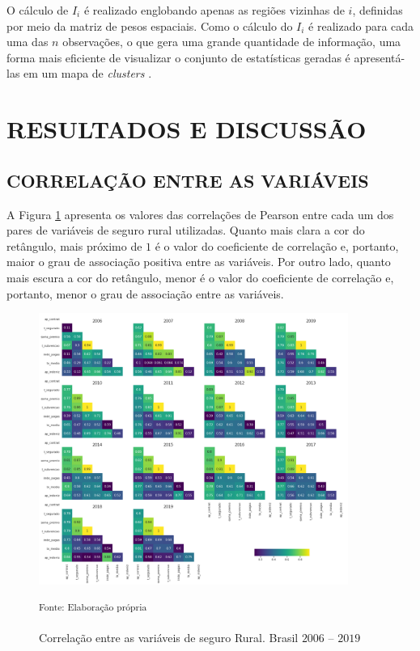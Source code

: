 O cálculo de $I_i$ é realizado englobando apenas as regiões vizinhas de $i$, definidas por meio da matriz de pesos espaciais. Como o cálculo do $I_i$ é realizado para cada uma das $n$ observações, o que gera uma grande quantidade de informação, uma forma mais eficiente de visualizar o conjunto de estatísticas geradas é apresentá-las em um mapa de \textit{clusters} \cite{almeida12_2}. 

\section{RESULTADOS E DISCUSSÃO}

\subsection{CORRELAÇÃO ENTRE AS VARIÁVEIS} 

A Figura \ref{corr_anos} apresenta os valores das correlações de Pearson entre cada um dos pares de variáveis de seguro rural utilizadas. Quanto mais clara a cor do retângulo, mais próximo de $1$ é o valor do coeficiente de correlação e, portanto, maior o grau de associação positiva entre as variáveis. Por outro lado, quanto mais escura a cor do retângulo, menor é o valor do coeficiente de correlação e, portanto, menor o grau de associação entre as variáveis.%

\begin{figure}[H]
	\centering
	\caption{Correlação entre as variáveis de seguro Rural. Brasil $2006$ -- $2019$}
	\includegraphics[width=0.9\textwidth]{figuras/corr_anos.png}
	\parbox{\dimexpr\linewidth-2cm}{\raggedright
    \strut \textsuperscript{Fonte: Elaboração própria}\strut}
    \label{corr_anos}
\end{figure}

